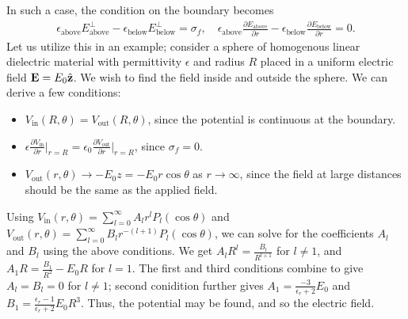 In such a case, the condition on the boundary becomes
\begin{align}
    \epsilon_{\text{above}} E^{\perp}_{\text{above}} - \epsilon_{\text{below}} E^{\perp}_{\text{below}} = \sigma_{f}, \quad \epsilon_{\text{above}} \frac{\partial E_{\text{above}}}{\partial r} - \epsilon_{\text{below}} \frac{\partial E_{\text{below}}}{\partial r} = 0.
\end{align}
Let us utilize this in an example; consider a sphere of homogenous linear dielectric material with permittivity $\epsilon$ and radius $R$ placed in a uniform electric field $\mathbf{E} = E_{0} \hat{\mathbf{z}}$. We wish to find the field inside and outside the sphere. We can derive a few conditions:
\begin{itemize}
    \item $V_{\text{in}}(R,\theta) = V_{\text{out}}(R,\theta)$, since the potential is continuous at the boundary.
    \item $\epsilon \frac{\partial V_{\text{in}}}{\partial r} \big|_{r=R} = \epsilon_{0} \frac{\partial V_{\text{out}}}{\partial r} \big|_{r=R}$, since $\sigma_{f} = 0$.
    \item $V_{\text{out}}(r,\theta) \to -E_{0} z = -E_{0} r \cos \theta$ as $r \to \infty$, since the field at large distances should be the same as the applied field.
\end{itemize}
Using $V_{\text{in}}(r,\theta) = \sum_{l=0}^{\infty} A_{l} r^{l} P_{l}(\cos \theta)$ and $V_{\text{out}}(r,\theta) = \sum_{l=0}^{\infty} B_{l} r^{-(l+1)} P_{l}(\cos \theta)$, we can solve for the coefficients $A_{l}$ and $B_{l}$ using the above conditions. We get $A_{l}R^{l} = \frac{B_{l}}{R^{l+1}}$ for $l \neq 1$, and $A_{1} R = \frac{B_{1}}{R^{2}} - E_{0}R$ for $l = 1$. The first and third conditions combine to give $A_{l} = B_{l} = 0$ for $l \neq 1$; second conidition further gives $A_{1} = \frac{-3}{\epsilon_{r}+2} E_{0}$ and $B_{1} = \frac{\epsilon_{r}-1}{\epsilon_{r}+2} E_{0} R^{3}$. Thus, the potential may be found, and so the electric field.